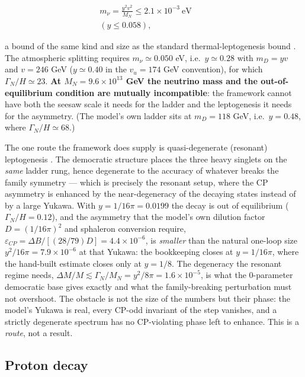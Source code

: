 \documentclass[aps,prd,twocolumn,amsmath,amssymb,superscriptaddress,nofootinbib,floatfix]{revtex4-2}
\begin{document}
\begin{multline}
    m_\nu = \frac{y^2 v^2}{M_N} \le 2.1\times10^{-3}\ \mathrm{eV}\qquad \\
    (y \le 0.058),
\end{multline}

a bound of the same kind and size as the standard thermal-leptogenesis
bound \cite{ref32}. The atmospheric splitting requires
\(m_\nu \simeq 0.050\) eV, i.e.~\(y \simeq 0.28\) with \(m_D = yv\) and
\(v = 246\) GeV (\(y \simeq 0.40\) in the \(v_u = 174\) GeV convention),
for which \(\Gamma_N/H \simeq 23\). \textbf{At
\(M_N = 9.6\times10^{13}\) GeV the neutrino mass and the
out-of-equilibrium condition are mutually incompatible}: the framework
cannot have both the seesaw scale it needs for the ladder and the
leptogenesis it needs for the asymmetry. (The model's own ladder sits at
\(m_D = 118\) GeV, i.e.~\(y = 0.48\), where \(\Gamma_N/H \simeq 68\).)

The one route the framework does supply is quasi-degenerate (resonant)
leptogenesis \cite{ref31,ref40}. The democratic structure places the
three heavy singlets on the \emph{same} ladder rung, hence degenerate to
the accuracy of whatever breaks the family symmetry --- which is
precisely the resonant setup, where the CP asymmetry is enhanced by the
near-degeneracy of the decaying states instead of by a large Yukawa.
With \(y = 1/16\pi = 0.0199\) the decay is out of equilibrium
(\(\Gamma_N/H = 0.12\)), and the asymmetry that the model's own dilution
factor \(D = (1/16\pi)^2\) and sphaleron conversion require,
\(\varepsilon_{CP} = \Delta B/[(28/79)D] = 4.4\times10^{-6}\), is
\emph{smaller} than the natural one-loop size
\(y^2/16\pi = 7.9\times10^{-6}\) at that Yukawa: the bookkeeping closes
at \(y = 1/16\pi\), where the hand-built estimate closes only at
\(y = 1/8\). The degeneracy the resonant regime needs,
\(\Delta M/M \lesssim \Gamma_N/M_N = y^2/8\pi = 1.6\times10^{-5}\), is
what the 0-parameter democratic base gives exactly and what the
family-breaking perturbation must not overshoot. The obstacle is not the
size of the numbers but their phase: the model's Yukawa is real, every
CP-odd invariant of the step vanishes, and a strictly degenerate
spectrum has no CP-violating phase left to enhance. This is a
\emph{route}, not a result.

\subsection{Proton decay}\label{proton-decay}
\end{document}
